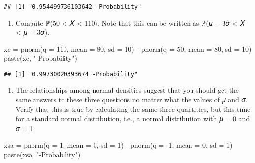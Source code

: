 \documentclass[
]{article}
\newenvironment{Shaded}{\begin{snugshade}}{\end{snugshade}}
\newcommand{\AttributeTok}[1]{\textcolor[rgb]{0.77,0.63,0.00}{#1}}
\newcommand{\DecValTok}[1]{\textcolor[rgb]{0.00,0.00,0.81}{#1}}
\newcommand{\FunctionTok}[1]{\textcolor[rgb]{0.00,0.00,0.00}{#1}}
\newcommand{\NormalTok}[1]{#1}
\newcommand{\OtherTok}[1]{\textcolor[rgb]{0.56,0.35,0.01}{#1}}
\newcommand{\SpecialCharTok}[1]{\textcolor[rgb]{0.00,0.00,0.00}{#1}}
\newcommand{\StringTok}[1]{\textcolor[rgb]{0.31,0.60,0.02}{#1}}
\providecommand{\tightlist}{%
  \setlength{\itemsep}{0pt}\setlength{\parskip}{0pt}}
\begin{document}
\begin{verbatim}
## [1] "0.954499736103642 -Probability"
\end{verbatim}

\begin{enumerate}
\def\labelenumi{\alph{enumi}.}
\setcounter{enumi}{2}
\tightlist
\item
  Compute ℙ(50 \textless{} 𝑋 \textless{} 110). Note that this can be
  written as ℙ(𝜇 − 3𝜎 \textless{} 𝑋 \textless{} 𝜇 + 3𝜎).
\end{enumerate}

\begin{Shaded}
\begin{Highlighting}[]
\NormalTok{xc }\OtherTok{=} \FunctionTok{pnorm}\NormalTok{(}\AttributeTok{q =} \DecValTok{110}\NormalTok{, }\AttributeTok{mean =} \DecValTok{80}\NormalTok{, }\AttributeTok{sd =} \DecValTok{10}\NormalTok{) }\SpecialCharTok{{-}} \FunctionTok{pnorm}\NormalTok{(}\AttributeTok{q =} \DecValTok{50}\NormalTok{, }\AttributeTok{mean =} \DecValTok{80}\NormalTok{, }\AttributeTok{sd =} \DecValTok{10}\NormalTok{) }
\FunctionTok{paste}\NormalTok{(xc, }\StringTok{"{-}Probability"}\NormalTok{)  }
\end{Highlighting}
\end{Shaded}

\begin{verbatim}
## [1] "0.99730020393674 -Probability"
\end{verbatim}

\begin{enumerate}
\def\labelenumi{\alph{enumi}.}
\setcounter{enumi}{3}
\tightlist
\item
  The relationships among normal densities suggest that you should get
  the same answers to these three questions no matter what the values of
  𝜇 and 𝜎. Verify that this is true by calculating the same three
  quantities, but this time for a standard normal distribution, i.e., a
  normal distribution with 𝜇 = 0 and 𝜎 = 1
\end{enumerate}

\begin{Shaded}
\begin{Highlighting}[]
\NormalTok{xsa }\OtherTok{=} \FunctionTok{pnorm}\NormalTok{(}\AttributeTok{q =} \DecValTok{1}\NormalTok{, }\AttributeTok{mean =} \DecValTok{0}\NormalTok{, }\AttributeTok{sd =} \DecValTok{1}\NormalTok{) }\SpecialCharTok{{-}} \FunctionTok{pnorm}\NormalTok{(}\AttributeTok{q =} \SpecialCharTok{{-}}\DecValTok{1}\NormalTok{, }\AttributeTok{mean =} \DecValTok{0}\NormalTok{, }\AttributeTok{sd =} \DecValTok{1}\NormalTok{) }
\FunctionTok{paste}\NormalTok{(xsa, }\StringTok{"{-}Probability"}\NormalTok{)  }
\end{Highlighting}
\end{Shaded}
\end{document}
